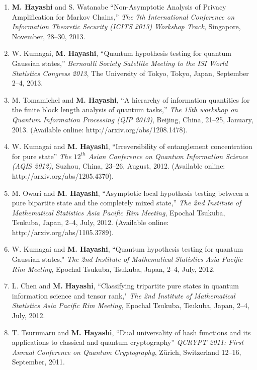 \documentclass[a4paper,12pt,oneside]{article}
\begin{document}
\begin{enumerate}
\item 
\textbf{M. Hayashi} and S. Watanabe
``Non-Asymptotic Analysis of Privacy Amplification for Markov Chains,''
{\em The 7th International Conference on Information Theoretic Security (ICITS 2013) Workshop Track},
Singapore, November, 28--30, 2013.

\item
W. Kumagai, \textbf{M. Hayashi}, 
``Quantum hypothesis testing for quantum Gaussian states,'' 
{\em Bernoulli Society Satellite Meeting to the ISI World Statistics Congress 2013}, 
The University of Tokyo, Tokyo, Japan,
September 2--4, 2013.

\item 
M. Tomamichel and \textbf{M. Hayashi}, ``A hierarchy of information quantities for the finite block length analysis of quantum tasks,''
{\em The 15th workshop on Quantum Information Processing (QIP 2013)}, Beijing, China, 21--25, January, 2013.
(Available online: http://arxiv.org/abs/1208.1478).

\item 
W. Kumagai and \textbf{M. Hayashi}, ``Irreversibility of entanglement concentration for pure state''
{\em The $12^{th}$ Asian Conference on Quantum Information Science (AQIS 2012)},
Suzhou, China, 23--26, August, 2012.
(Available online: http://arxiv.org/abs/1205.4370).

\item 
M. Owari and \textbf{M. Hayashi}, 
``Asymptotic local hypothesis testing between a pure bipartite state and the completely mixed state,''
{\em The 2nd Institute of Mathematical Statistics Asia Pacific Rim Meeting}, 
Epochal Tsukuba, Tsukuba, Japan, 2--4, July, 2012.
(Available online: http://arxiv.org/abs/1105.3789).

\item 
W. Kumagai and \textbf{M. Hayashi}, 
``Quantum hypothesis testing for quantum Gaussian states," 
{\em The 2nd Institute of Mathematical Statistics Asia Pacific Rim Meeting}, 
Epochal Tsukuba, Tsukuba, Japan, 2--4, July, 2012.

\item 
L. Chen and \textbf{M. Hayashi}, 
``Classifying tripartite pure states in quantum information science and tensor rank," 
{\em The 2nd Institute of Mathematical Statistics Asia Pacific Rim Meeting}, 
Epochal Tsukuba, Tsukuba, Japan, 2--4, July, 2012.

\item 
T. Tsurumaru and \textbf{M. Hayashi}, ``Dual universality of hash functions and its applications to classical and quantum cryptography'' 
{\em QCRYPT 2011: First Annual Conference on Quantum Cryptography}, 
Z\"{u}rich, Switzerland 12--16, September, 2011.


\end{enumerate}
\end{document}
